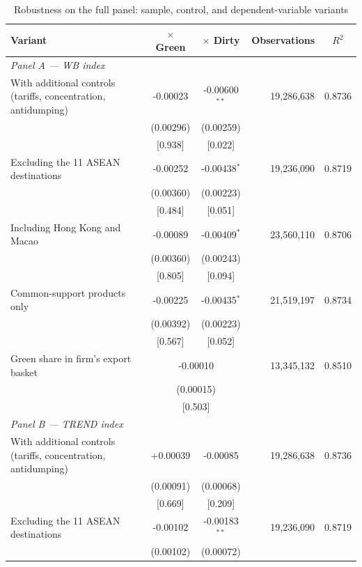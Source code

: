 \begin{table}[htbp]
\centering
\footnotesize
\caption{Robustness on the full panel: sample, control, and dependent-variable variants}
\label{tab:robust-full}
\begin{threeparttable}
\begin{tabular}{lccrc}
\toprule
Variant & $\times$ Green & $\times$ Dirty & Observations & $R^2$ \\
\midrule
\multicolumn{5}{l}{\textit{Panel A --- WB index}} \\
\addlinespace
With additional controls (tariffs, concentration, antidumping) & -0.00023 & -0.00600$^{**}$ & 19,286,638 & 0.8736 \\
 & (0.00296) & (0.00259) & & \\
 & [0.938] & [0.022] & & \\
\addlinespace
Excluding the 11 ASEAN destinations & -0.00252 & -0.00438$^{*}$ & 19,236,090 & 0.8719 \\
 & (0.00360) & (0.00223) & & \\
 & [0.484] & [0.051] & & \\
\addlinespace
Including Hong Kong and Macao & -0.00089 & -0.00409$^{*}$ & 23,560,110 & 0.8706 \\
 & (0.00360) & (0.00243) & & \\
 & [0.805] & [0.094] & & \\
\addlinespace
Common-support products only & -0.00225 & -0.00435$^{*}$ & 21,519,197 & 0.8734 \\
 & (0.00392) & (0.00223) & & \\
 & [0.567] & [0.052] & & \\
\addlinespace
Green share in firm's export basket & \multicolumn{2}{c}{-0.00010} & 13,345,132 & 0.8510 \\
 & \multicolumn{2}{c}{(0.00015)} & & \\
 & \multicolumn{2}{c}{[0.503]} & & \\
\midrule
\multicolumn{5}{l}{\textit{Panel B --- TREND index}} \\
\addlinespace
With additional controls (tariffs, concentration, antidumping) & +0.00039 & -0.00085 & 19,286,638 & 0.8736 \\
 & (0.00091) & (0.00068) & & \\
 & [0.669] & [0.209] & & \\
\addlinespace
Excluding the 11 ASEAN destinations & -0.00102 & -0.00183$^{**}$ & 19,236,090 & 0.8719 \\
 & (0.00102) & (0.00072) & & \\

\end{tabular}
\end{threeparttable}
\end{table}
